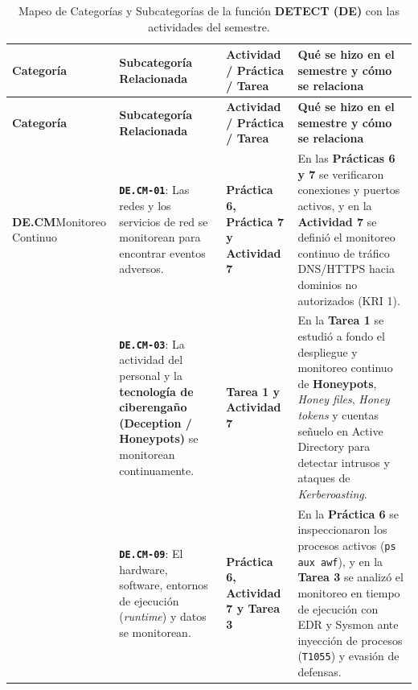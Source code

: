 \documentclass[letterpaper,11pt]{article}
\begin{document}
\begingroup
\scriptsize
\setlength{\tabcolsep}{4pt}
\renewcommand{\arraystretch}{1.24}
\begin{longtable}{|L{2.8cm}|L{4.5cm}|L{2.9cm}|L{6.5cm}|}
\caption{Mapeo de Categorías y Subcategorías de la función \textbf{DETECT (DE)} con las actividades del semestre.}
\label{tab:mapeo-de} \\
\hline
{}
\textbf{Categoría} & \textbf{Subcategoría Relacionada} & \textbf{Actividad / Práctica / Tarea} & \textbf{Qué se hizo en el semestre y cómo se relaciona} \\
\hline
\endfirsthead
\hline
{}
\textbf{Categoría} & \textbf{Subcategoría Relacionada} & \textbf{Actividad / Práctica / Tarea} & \textbf{Qué se hizo en el semestre y cómo se relaciona} \\
\hline
\endhead
\hline
\endfoot

\textbf{DE.CM}\newline Monitoreo Continuo &
\textbf{\texttt{DE.CM-01}}: Las redes y los servicios de red se monitorean para encontrar eventos adversos. &
\textbf{Práctica 6, Práctica 7 y Actividad 7} &
En las \textbf{Prácticas 6 y 7} se verificaron conexiones y puertos activos, y en la \textbf{Actividad 7} se definió el monitoreo continuo de tráfico DNS/HTTPS hacia dominios no autorizados (KRI 1). \\
\nopagebreak
 &
\textbf{\texttt{DE.CM-03}}: La actividad del personal y la \textbf{tecnología de ciberengaño (Deception / Honeypots)} se monitorean continuamente. &
\textbf{Tarea 1 y Actividad 7} &
En la \textbf{Tarea 1} se estudió a fondo el despliegue y monitoreo continuo de \textbf{Honeypots}, \textit{Honey files}, \textit{Honey tokens} y cuentas señuelo en Active Directory para detectar intrusos y ataques de \textit{Kerberoasting}. \\
\nopagebreak
 &
\textbf{\texttt{DE.CM-09}}: El hardware, software, entornos de ejecución (\textit{runtime}) y datos se monitorean. &
\textbf{Práctica 6, Actividad 7 y Tarea 3} &
En la \textbf{Práctica 6} se inspeccionaron los procesos activos (\texttt{ps aux awf}), y en la \textbf{Tarea 3} se analizó el monitoreo en tiempo de ejecución con EDR y Sysmon ante inyección de procesos (\texttt{T1055}) y evasión de defensas. \\
\hline


\end{longtable}
\end{document}
